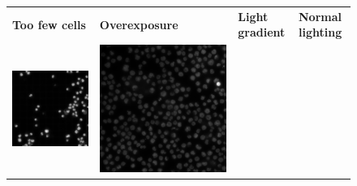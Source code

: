 \begin{figure}[H]
    \centering
    \centering
        \begin{tabularx}{\textwidth}{YYYY}
            \textbf{Too few cells} &
            \textbf{Overexposure} &
            \textbf{Light gradient} &
            \textbf{Normal lighting} \\
            \includegraphics{bilder/lightning-conditions/lightning-1.png} & \includegraphics{bilder/lightning-conditions/lightning-2.png} &

\end{tabularx}
\end{figure}

